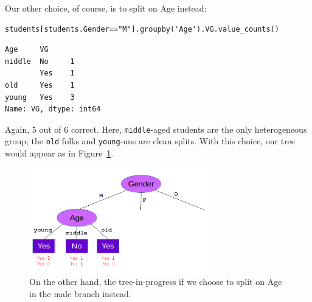 Our other choice, of course, is to split on \textsf{Age} instead:

\begin{Verbatim}[fontsize=\small,samepage=true,frame=single,framesep=3mm]
students[students.Gender=="M"].groupby('Age').VG.value_counts()
\end{Verbatim}
\vspace{-.2in}

\begin{Verbatim}[fontsize=\small,samepage=true,frame=leftline,framesep=5mm,framerule=1mm]
Age     VG 
middle  No     1
        Yes    1
old     Yes    1
young   Yes    3
Name: VG, dtype: int64
\end{Verbatim}

Again, 5 out of 6 correct. Here, \texttt{middle}-aged students are the only
heterogeneous group; the \texttt{old} folks and \texttt{young}-uns are clean
splits. With this choice, our tree would appear as in
Figure~\ref{fig:maleAgeSplit}.

\begin{figure}[ht]
\centering
\includegraphics[width=0.7\textwidth]{maleAgeSplit.png}
\caption{On the other hand, the tree-in-progress if we choose to split on
\textsf{Age} in the male branch instead.}
\label{fig:maleAgeSplit}
\end{figure}

